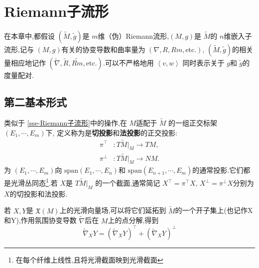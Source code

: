 \documentclass[../../几何与拓扑.tex]{subfiles}
\begin{document}
    
\ifSubfilesClassLoaded{
    \frontmatter

    \tableofcontents
    
    \mainmatter
}{}



\chapter{Riemann子流形}

在本章中,都假设 \(  \left( \tilde{M},\tilde{g}  \right)   \)是 \(  m  \)维（伪）Riemann流形,\(  \left( M,g \right)   \)是 \(  \tilde{M}  \)的 \(  n  \)维嵌入子流形,记与 \(  \left( M,g \right)   \)有关的协变导数和曲率量为 \(  \left(  \nabla ,R,Rm, \text{etc}. \right)   \), \(  \left( \tilde{M}, \tilde{g}  \right)   \)的相关量相应地记作 \(  \left(  \tilde{\nabla} ,\tilde{R}, \widetilde{Rm}, \text{etc.} \right)   \).可以不严格地用 \(  \left<v,w \right>  \)   同时表示关于 \(  g  \)和 \(  \tilde{g}   \)的度量配对.  


\section{第二基本形式}

类似于 \ref{sse-Riemann子流形}中的操作,在 \(  M  \)适配于 \(  \tilde{M}  \)  的一组正交标架 \(  \left(  E_1,\cdots,E_m  \right)   \)下, 定义称为是\textbf{切投影}和\textbf{法投影}的正交投影: \[
\begin{aligned}
    \pi ^{\top}&: T \tilde{M}|_{M}\to TM,\\ 
     \pi ^{\perp}&: T \tilde{M}|_{M}\to NM.  
\end{aligned}
\]为 \(  \left(  E_1,\cdots,E_m  \right)   \)向 \(  \mathrm{span} \left(  E_1,\cdots,E_n  \right)   \)和 \(  \mathrm{span}\left( E_{n+ 1},\cdots ,E_{m} \right)   \)的通常投影.它们都是光滑丛同态\footnote{在每个纤维上线性,且将光滑截面映到光滑截面}.若 \(  X  \)是 \(  T \tilde{M}|_{M}  \)   的一个截面,通常简记 \(  X^{\top}=  \pi ^{\top}X  \), \(  X^{\perp}= \pi ^{\perp}X  \)分别为\(  X  \)的切投影和法投影. 

若 \(  X,Y  \)是 \(  \mathfrak{X}\left( M \right)   \)上的光滑向量场,可以将它们延拓到 \(  \tilde{M}  \)的一个开子集上(也记作X和Y),作用氛围协变导数 \(   \tilde{\nabla} \)后在 \(  M  \)上的点分解,得到 \[
 \tilde{\nabla} _{X}Y= \left(  \tilde{\nabla} _{X}Y \right)^{\top}+ \left(  \tilde{\nabla} _{X}Y \right)^{\perp}  
\]     
\end{document}
